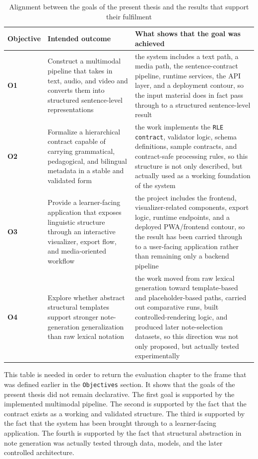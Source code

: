 \documentclass[12pt,a4paper,oneside]{report}
\begin{document}
\begin{table}[H]
  \centering
  \caption{Alignment between the goals of the present thesis and the results that support their fulfilment}
  \begin{tabularx}{\textwidth}{>{\bfseries}p{1.3cm} X X}
    \toprule
    Objective & Intended outcome & What shows that the goal was achieved \\
    \midrule
    O1 & Construct a multimodal pipeline that takes in text, audio, and video and converts them into structured sentence-level representations & the system includes a text path, a media path, the sentence-contract pipeline, runtime services, the API layer, and a deployment contour, so the input material does in fact pass through to a structured sentence-level result \\
    O2 & Formalize a hierarchical contract capable of carrying grammatical, pedagogical, and bilingual metadata in a stable and validated form & the work implements the \texttt{RLE contract}, validator logic, schema definitions, sample contracts, and contract-safe processing rules, so this structure is not only described, but actually used as a working foundation of the system \\
    O3 & Provide a learner-facing application that exposes linguistic structure through an interactive visualizer, export flow, and media-oriented workflow & the project includes the frontend, visualizer-related components, export logic, runtime endpoints, and a deployed PWA/frontend contour, so the result has been carried through to a user-facing application rather than remaining only a backend pipeline \\
    O4 & Explore whether abstract structural templates support stronger note-generation generalization than raw lexical notation & the work moved from raw lexical generation toward template-based and placeholder-based paths, carried out comparative runs, built controlled-rendering logic, and produced later note-selection datasets, so this direction was not only proposed, but actually tested experimentally \\
    \bottomrule
  \end{tabularx}
\end{table}

This table is needed in order to return the evaluation chapter to the frame that was defined earlier in the \texttt{Objectives} section. It shows that the goals of the present thesis did not remain declarative. The first goal is supported by the implemented multimodal pipeline. The second is supported by the fact that the contract exists as a working and validated structure. The third is supported by the fact that the system has been brought through to a learner-facing application. The fourth is supported by the fact that structural abstraction in note generation was actually tested through data, models, and the later controlled architecture.
\end{document}
